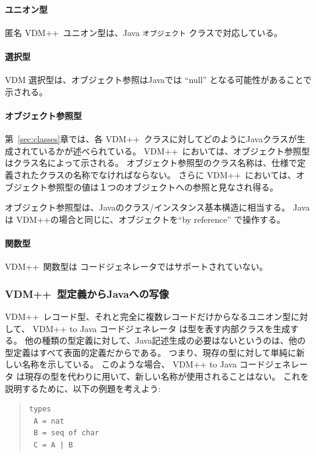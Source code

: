 \documentclass[\pformat,11pt]{jarticle}
\newcommand{\tcg}{コードジェネレータ}
\newcommand{\VDM}{VDM++}
\newcommand{\cg}{VDM++ to Java コードジェネレータ}
\begin{document}
\paragraph{ユニオン型}

匿名 \VDM\ ユニオン型は、Java {\tt オブジェクト} クラスで対応している。

\paragraph{選択型}

   VDM 選択型は、オブジェクト参照はJavaでは ``null'' となる可能性があることで示される。

\paragraph{オブジェクト参照型}

 第~\ref{sec:classes}章では、各 \VDM\ クラスに対してどのようにJavaクラスが生成されているかが述べられている。
 \VDM\ においては、オブジェクト参照型はクラス名によって示される。
オブジェクト参照型のクラス名称は、仕様で定義されたクラスの名称でなければならない。
さらに \VDM\ においては、オブジェクト参照型の値は１つのオブジェクトへの参照と見なされ得る。

オブジェクト参照型は、Javaのクラス/インスタンス基本構造に相当する。
Java は \VDM{}の場合と同じに、オブジェクトを``by reference'' で操作する。

\paragraph{関数型}

 \VDM\ 関数型は \tcg{}ではサポートされていない。


\subsubsection{\VDM\ 型定義からJavaへの写像}

 \VDM\ レコード型、それと完全に複数レコードだけからなるユニオン型に対して、 \cg{} は型を表す内部クラスを生成する。
他の種類の型定義に対して、Java記述生成の必要はないというのは、他の型定義はすべて表面的定義だからである。
つまり、現存の型に対して単純に新しい名称を示している。
このような場合、 \cg{} は現存の型を代わりに用いて、新しい名称が使用されることはない。
これを説明するために、以下の例題を考えよう:
\begin{quote}
\begin{verbatim}
types
 A = nat
 B = seq of char
 C = A | B
\end{verbatim}
\end{quote}
\end{document}
